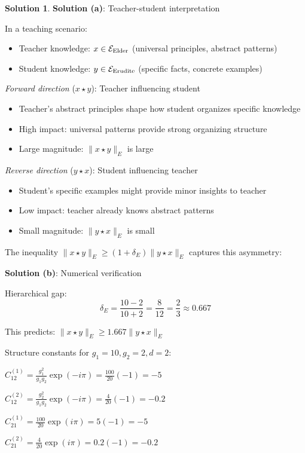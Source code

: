 \documentclass[12pt,a4paper]{article}
\theoremstyle{definition}
\newtheorem{solution}{Solution}[section]
\theoremstyle{remark}
\begin{document}
\begin{solution}
\textbf{Solution (a)}: Teacher-student interpretation

In a teaching scenario:
\begin{itemize}
\item Teacher knowledge: $x \in \mathcal{E}_{\text{Elder}}$ (universal principles, abstract patterns)
\item Student knowledge: $y \in \mathcal{E}_{\text{Erudite}}$ (specific facts, concrete examples)
\end{itemize}

\textit{Forward direction} ($x \star y$): Teacher influencing student
\begin{itemize}
\item Teacher's abstract principles shape how student organizes specific knowledge
\item High impact: universal patterns provide strong organizing structure
\item Large magnitude: $\|x \star y\|_E$ is large
\end{itemize}

\textit{Reverse direction} ($y \star x$): Student influencing teacher
\begin{itemize}
\item Student's specific examples might provide minor insights to teacher
\item Low impact: teacher already knows abstract patterns
\item Small magnitude: $\|y \star x\|_E$ is small
\end{itemize}

The inequality $\|x \star y\|_E \geq (1+\delta_E) \|y \star x\|_E$ captures this asymmetry:

\textbf{Solution (b)}: Numerical verification

Hierarchical gap:
$$\delta_E = \frac{10 - 2}{10 + 2} = \frac{8}{12} = \frac{2}{3} \approx 0.667$$

This predicts: $\|x \star y\|_E \geq 1.667 \|y \star x\|_E$

Structure constants for $g_1=10, g_2=2, d=2$:

$C_{12}^{(1)} = \frac{g_1^2}{g_1 g_2} \exp(-i\pi) = \frac{100}{20}(-1) = -5$

$C_{12}^{(2)} = \frac{g_2^2}{g_1 g_2} \exp(-i\pi) = \frac{4}{20}(-1) = -0.2$

$C_{21}^{(1)} = \frac{100}{20} \exp(i\pi) = 5(-1) = -5$

$C_{21}^{(2)} = \frac{4}{20} \exp(i\pi) = 0.2(-1) = -0.2$


\end{solution}
\end{document}
